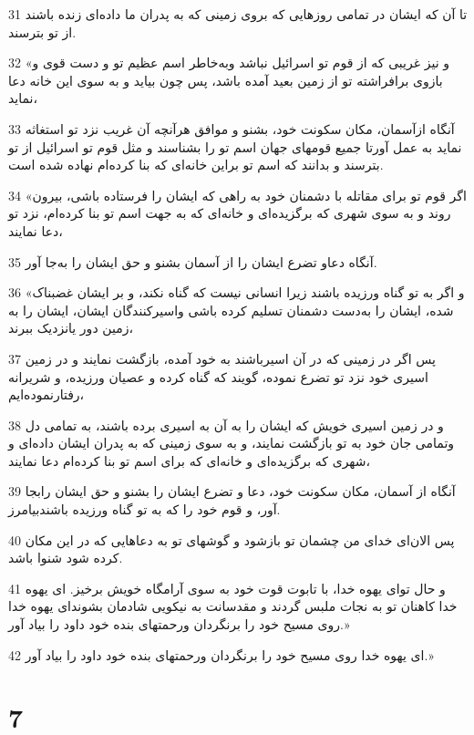 \par 31 تا آن که ایشان در تمامی روزهایی که بروی زمینی که به پدران ما داده‌ای زنده باشند از تو بترسند.
\par 32 «و نیز غریبی که از قوم تو اسرائیل نباشد وبه‌خاطر اسم عظیم تو و دست قوی و بازوی برافراشته تو از زمین بعید آمده باشد، پس چون بیاید و به سوی این خانه دعا نماید،
\par 33 آنگاه ازآسمان، مکان سکونت خود، بشنو و موافق هرآنچه آن غریب نزد تو استغاثه نماید به عمل آورتا جمیع قومهای جهان اسم تو را بشناسند و مثل قوم تو اسرائیل از تو بترسند و بدانند که اسم تو براین خانه‌ای که بنا کرده‌ام نهاده شده است.
\par 34 «اگر قوم تو برای مقاتله با دشمنان خود به راهی که ایشان را فرستاده باشی، بیرون روند و به سوی شهری که برگزیده‌ای و خانه‌ای که به جهت اسم تو بنا کرده‌ام، نزد تو دعا نمایند،
\par 35 آنگاه دعاو تضرع ایشان را از آسمان بشنو و حق ایشان را به‌جا آور.
\par 36 «و اگر به تو گناه ورزیده باشند زیرا انسانی نیست که گناه نکند، و بر ایشان غضبناک شده، ایشان را به‌دست دشمنان تسلیم کرده باشی واسیرکنندگان ایشان، ایشان را به زمین دور یانزدیک ببرند،
\par 37 پس اگر در زمینی که در آن اسیرباشند به خود آمده، بازگشت نمایند و در زمین اسیری خود نزد تو تضرع نموده، گویند که گناه کرده و عصیان ورزیده، و شریرانه رفتارنموده‌ایم،
\par 38 و در زمین اسیری خویش که ایشان را به آن به اسیری برده باشند، به تمامی دل وتمامی جان خود به تو بازگشت نمایند، و به سوی زمینی که به پدران ایشان داده‌ای و شهری که برگزیده‌ای و خانه‌ای که برای اسم تو بنا کرده‌ام دعا نمایند،
\par 39 آنگاه از آسمان، مکان سکونت خود، دعا و تضرع ایشان را بشنو و حق ایشان رابجا آور، و قوم خود را که به تو گناه ورزیده باشندبیامرز.
\par 40 پس الان‌ای خدای من چشمان تو بازشود و گوشهای تو به دعاهایی که در این مکان کرده شود شنوا باشد.
\par 41 و حال تو‌ای یهوه خدا، با تابوت قوت خود به سوی آرامگاه خویش برخیز. ای یهوه خدا کاهنان تو به نجات ملبس گردند و مقدسانت به نیکویی شادمان بشوند‌ای یهوه خدا روی مسیح خود را برنگردان ورحمتهای بنده خود داود را بیاد آور.»
\par 42 ‌ای یهوه خدا روی مسیح خود را برنگردان ورحمتهای بنده خود داود را بیاد آور.»
 
\chapter{7}

